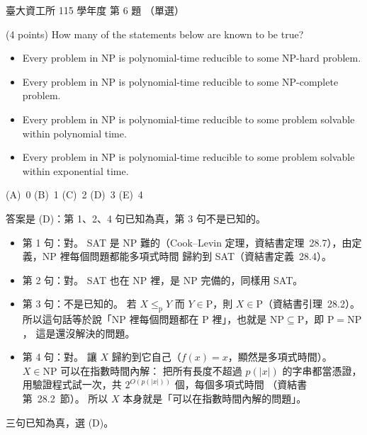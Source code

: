 \begin{pastexam}[label={px:ntu-115-dsa-06}]{臺大資工所 115 學年度 第 6 題}
（單選）

(4 points) How many of the statements below are known to be true?
\begin{itemize}
\item Every problem in NP is polynomial-time reducible to some NP-hard problem.
\item Every problem in NP is polynomial-time reducible to some NP-complete problem.
\item Every problem in NP is polynomial-time reducible to some problem solvable within polynomial time.
\item Every problem in NP is polynomial-time reducible to some problem solvable within exponential time.
\end{itemize}


(A)~0 \qquad (B)~1 \qquad (C)~2 \qquad (D)~3 \qquad (E)~4
\end{pastexam}

\begin{pastsoln}
答案是 (D)：第 1、2、4 句已知為真，第 3 句不是已知的。

\begin{itemize}
\item 第 1 句：對。 SAT 是 NP 難的（Cook--Levin 定理，資結書定理~28.7），由定義，NP 裡每個問題都能多項式時間
歸約到 SAT（資結書定義~28.4）。
\item 第 2 句：對。 SAT 也在 NP 裡，是 NP 完備的，同樣用 SAT。
\item 第 3 句：不是已知的。 若 $X \le_{\mathrm{p}} Y$ 而 $Y \in \mathrm{P}$，則 $X \in \mathrm{P}$（資結書引理~28.2）。
所以這句話等於說「NP 裡每個問題都在 P 裡」，也就是 $\mathrm{NP} \subseteq \mathrm{P}$，即 $\mathrm{P} = \mathrm{NP}$，
這是還沒解決的問題。
\item 第 4 句：對。 讓 $X$ 歸約到它自己（$f(x) = x$，顯然是多項式時間）。 $X \in \mathrm{NP}$ 可以在指數時間內解：
把所有長度不超過 $p(|x|)$ 的字串都當憑證，用驗證程式試一次，共 $2^{O(p(|x|))}$ 個，每個多項式時間
（資結書第~28.2~節）。 所以 $X$ 本身就是「可以在指數時間內解的問題」。
\end{itemize}
三句已知為真，選 (D)。
\end{pastsoln}
